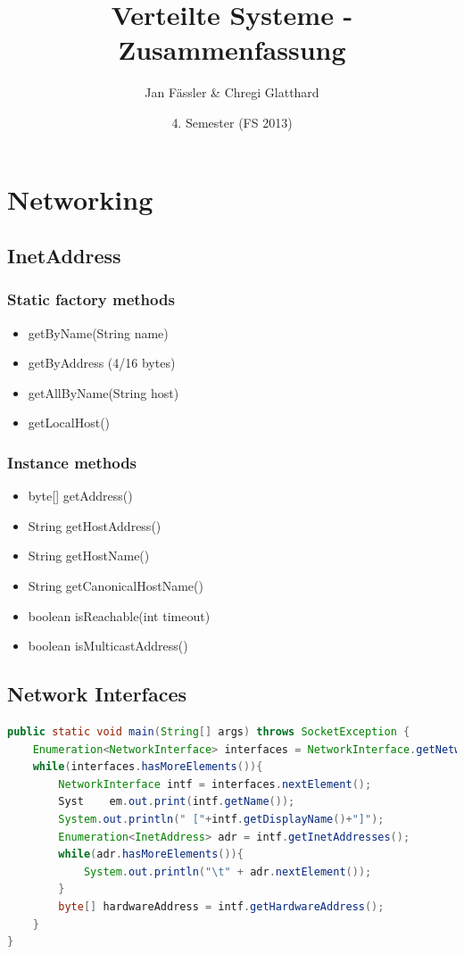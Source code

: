 \documentclass[10pt]{article}
\title{
	\vspace{5cm}
	Verteilte Systeme - Zusammenfassung
}
\author{Jan Fässler \& Chregi Glatthard}
\date{4. Semester (FS 2013)}
\begin{document}
\maketitle
\thispagestyle{fancy}

\newpage

\tableofcontents	  	


\newpage
\setcounter{page}{1}


\section{Networking}
\subsection{InetAddress}
\subsubsection*{Static factory methods}
\begin{itemize}
	\item getByName(String name)
	\item getByAddress (4/16 bytes)
	\item getAllByName(String host)
	\item getLocalHost()
\end{itemize}
\subsubsection*{Instance methods}
\begin{itemize}
	\item byte[] getAddress()
	\item String getHostAddress()
	\item String getHostName()
	\item String getCanonicalHostName()
	\item boolean isReachable(int timeout)
	\item boolean isMulticastAddress()
\end{itemize}
\subsection{Network Interfaces}
\begin{lstlisting}[language=Java, caption=Network Interfaces and its addresses, style=JavaStyle]
public static void main(String[] args) throws SocketException {
	Enumeration<NetworkInterface> interfaces = NetworkInterface.getNetworkInterfaces();
	while(interfaces.hasMoreElements()){
		NetworkInterface intf = interfaces.nextElement();
		Syst	em.out.print(intf.getName());
		System.out.println(" ["+intf.getDisplayName()+"]");
		Enumeration<InetAddress> adr = intf.getInetAddresses();
		while(adr.hasMoreElements()){
			System.out.println("\t" + adr.nextElement());
		}
		byte[] hardwareAddress = intf.getHardwareAddress();
	}
}
\end{lstlisting}
\end{document}

